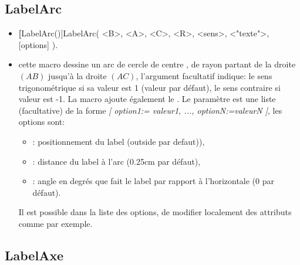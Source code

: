 \subsection{LabelArc}

\begin{itemize}
 \item \util \textbf[LabelArc()]{LabelArc( <B>, <A>, <C>, <R>, <sens>, <"texte">, [options] )}.
 \item \desc cette macro dessine un arc de cercle de centre , de rayon  partant de la droite $(AB)$ jusqu'à la droite $(AC)$, l'argument facultatif  indique: le sens trigonométrique si sa valeur est 1 (valeur par défaut), le sens contraire si valeur est -1. La macro ajoute également le . Le paramètre  est une liste (facultative) de la forme \textsl{[ option1:= valeur1, ..., optionN:=valeurN ]}, les options sont:
  \begin{itemize}
  \item {}: positionnement du label (outside par defaut)),
  \item {}: distance du label à l'arc (0.25cm par défaut),
  \item {}: angle en degrés que fait le label par rapport à l'horizontale ($0$ par défaut).
  \end{itemize}
Il est possible dans la liste des options, de modifier localement des attributs comme  par exemple.
\end{itemize}



\subsection{LabelAxe}

